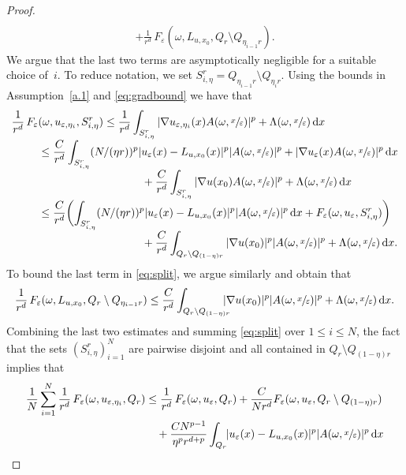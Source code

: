 \documentclass[JEP,XML,SOM,Unicode,published]{cedram}
\theoremstyle{definition}
\let\e\varepsilon
\let\w\omega
\newcommand{\dx}{\,\mathrm{d}x}
\begin{document}
\begin{proof}
\begin{multline}
\\
+\frac{1}{r^d}\,F_{\e}(\w,L_{u,x_0},Q_{r}\setminus Q_{\eta_{i-1}r}).
\end{multline}
We argue that the last two terms are asymptotically negligible for a suitable choice of~$i$. To reduce notation, we set $S_{i,\eta}^r=Q_{\eta_{i-1}r}\setminus Q_{\eta_i r}$. Using the bounds in Assumption~\ref{a.1} and \eqref{eq:gradbound} we have that
\begin{align*}
\frac{1}{r^d}\,F_{\e}&(\w,u_{\e,\eta_i},S^r_{i,\eta})\leq \frac{1}{r^d}\int_{S^r_{i,\eta}}|\nabla u_{\e,\eta_i}(x)A(\w,\sfrac{x}{\e})|^p+\Lambda(\w,\sfrac{x}{\e})\dx
\\[-3pt]
&\leq \frac{C}{r^d}\int_{S^r_{i,\eta}}(N/(\eta r))^{p} |u_{\e}(x)-L_{u,x_0}(x)|^p|A(\w,\sfrac{x}{\e})|^p+|\nabla u_{\e}(x)A(\w,\sfrac{x}{\e})|^p\dx
\\[-3pt]
&\hspace*{3.3cm}+\frac{C}{r^d}\int_{S^r_{i,\eta}}|\nabla u(x_0)A(\w,\sfrac{x}{\e})|^p+\Lambda(\w,\sfrac{x}{\e})\dx
\\[-3pt]
&\leq \frac{C}{r^d} \biggl(\int_{S_{i,\eta}^r}(N/(\eta r))^{p} |u_{\e}(x)-L_{u,x_0}(x)|^p|A(\w,\sfrac{x}{\e})|^p\dx+F_{\e}(\w,u_{\e},S_{i,\eta}^r)\biggr)
\\[-3pt]
&\hspace*{3.3cm}+\frac{C}{r^d}\int_{Q_r\setminus Q_{(1-\eta)r}}|\nabla u(x_0)|^p|A(\w,\sfrac{x}{\e})|^p+\Lambda(\w,\sfrac{x}{\e})\dx.
\end{align*}
To bound the last term in \eqref{eq:split}, we argue similarly and obtain that
\begin{equation*}
\frac{1}{r^d}\,F_{\e}(\w,L_{u,x_0},Q_{r}\setminus Q_{\eta_{i-1}r})\leq \frac{C}{r^d}\int_{Q_r\setminus Q_{(1-\eta) r}}\hspace*{-3mm}|\nabla u(x_0)|^p|A(\w,\sfrac{x}{\e})|^p+\Lambda(\w,\sfrac{x}{\e})\dx.
\end{equation*}
Combining the last two estimates and summing \eqref{eq:split} over $1\leq i\leq N$, the fact that the sets $(S^r_{i,\eta})_{i=1}^N$ are pairwise disjoint and all contained in $Q_r\setminus Q_{(1-\eta)r}$ implies that
\begin{align*}
\frac{1}{N}\sum_{i=1}^N\frac{1}{r^d}\,F_{\e}(\w,u_{\e,\eta_i},Q_r)&\leq \frac{1}{r^d}\,F_{\e}(\w,u_{\e},Q_r)+\frac{C}{Nr^d} F_{\e}(\w,u_{\e},Q_r\setminus Q_{(1-\eta)r})
\\
&\quad+\frac{CN^{p-1}}{\eta^p r^{d+p}}\int_{Q_r}\hspace*{-1mm}|u_{\e}(x)-L_{u,x_0}(x)|^p|A(\w,\sfrac{x}{\e})|^p\dx
\\

\end{align*}
\end{proof}
\end{document}
